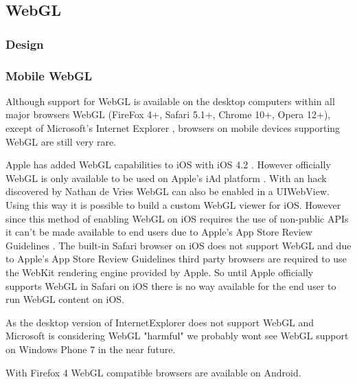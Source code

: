 \documentclass[12pt,journal,compsoc]{IEEEtran}
\begin{document}
\subsection{WebGL}

\subsubsection{Design}


\subsubsection{Mobile WebGL}
Although support for WebGL is available on the desktop computers within all major browsers WebGL (FireFox 4+, Safari 5.1+, Chrome 10+, Opera 12+), except of Microsoft's Internet Explorer \cite{Golubovic2011}, browsers on mobile devices supporting WebGL are still very rare.

Apple has added WebGL capabilities to iOS with iOS 4.2 \cite{deVries2011, iAdDocu}. However officially WebGL is only available to be used on Apple’s iAd platform \cite{deVries2011, cmarrin2011}. With an hack discovered by Nathan de Vries \cite{deVries2011} WebGL can also be enabled in a UIWebView. Using this way it is possible to build a custom WebGL viewer for iOS. However since this method of enabling WebGL on iOS requires the use of non-public APIs it can’t be made available to end users due to Apple's App Store Review Guidelines \cite{appstorereviewguidelines}. The built-in Safari browser on iOS does not support WebGL and due to Apple’s App Store Review Guidelines \cite{appstorereviewguidelines} third party browsers are required to use the WebKit rendering engine provided by Apple. So until Apple officially supports WebGL in Safari on iOS there is no way available for the end user to run WebGL content on iOS.

As the desktop version of InternetExplorer does not support WebGL \cite{Golubovic2011} and Microsoft is considering WebGL "harmful" \cite{microsoftWebGLHarmful} we probably wont see WebGL support on Windows Phone 7 in the near future. 

With Firefox 4 WebGL compatible browsers are available on Android. %

\end{document}
